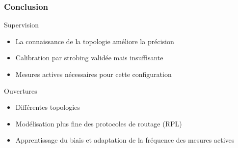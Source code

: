 \begin{frame}\frametitle{Conclusion}

  \begin{block}{Supervision}
      \begin{itemize}
        \item La connaissance de la topologie améliore la précision
        \item Calibration par strobing validée mais insuffisante
        \item Mesures actives nécessaires pour cette configuration
      \end{itemize}
  \end{block}

  \begin{block}{Ouvertures}
    \begin{itemize}
      \item Différentes topologies
      \item Modélisation plus fine des protocoles de routage (RPL)
      \item Apprentissage du biais et adaptation de la fréquence des mesures actives
    \end{itemize}
  \end{block}


\end{frame}
